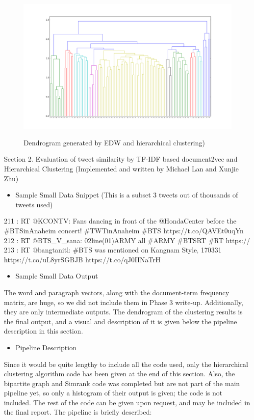 \documentclass[10pt]{article}
\begin{document}
\begin{itemize}
\begin{figure}[h]
	\caption{Dendrogram generated by EDW and hierarchical clustering)}
	\centering
	\includegraphics[scale=0.3]{figure_1_hcluster.png}
	\label{fig1}
\end{figure}


\end{itemize}
Section 2. Evaluation of tweet similarity by TF-IDF based document2vec and Hierarchical Clustering (Implemented and written by Michael Lan and Xunjie Zhu)

\begin{itemize}
	\item Sample Small Data Snippet (This is a subset 3 tweets out of thousands of tweets used)
\end{itemize}
211 : RT @KCONTV: Fans dancing in front of the @HondaCenter before the \#BTSinAnaheim concert! \#TWTinAnaheim \#BTS https://t.co/QAVEt0uqYn
212 : RT @BTS\_V\_sana:   02line(01)ARMY  all    \#ARMY  \#BTSRT  \#RT https://
213 : RT @bangtanitl: \#BTS was mentioned on Kangnam Style, 170331 https://t.co/uL8yrSGBJB https://t.co/qJ0IINaTrH

\begin{itemize}
	\item Sample Small Data Output
\end{itemize}
The word and paragraph vectors, along with the document-term frequency matrix, are huge, so we did not include them in Phase 3 write-up. Additionally, they are only intermediate outputs. The dendrogram of the clustering results is the final output, and a visual and description of it is given below the pipeline description in this section.

\begin{itemize}
	\item Pipeline Description
\end{itemize}
Since it would be quite lengthy to include all the code used, only the hierarchical clustering algorithm code has been given at the end of this section. Also, the bipartite graph and Simrank code was completed but are not part of the main pipeline yet, so only a histogram of their output is given; the code is not included. The rest of the code can be given upon request, and may be included in the final report. The pipeline is briefly described:
\end{document}
